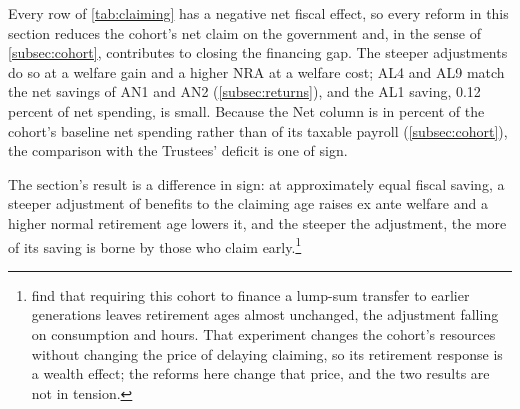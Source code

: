 Every row of \autoref{tab:claiming} has a negative net fiscal effect, so every reform in this section reduces the cohort's net claim on the government and, in the sense of \autoref{subsec:cohort}, contributes to closing the financing gap. %
The steeper adjustments do so at a welfare gain and a higher NRA at a welfare cost; AL4 and AL9 match the net savings of AN1 and AN2 (\autoref{subsec:returns}), and the AL1 saving, 0.12 percent of net spending, is small. %
Because the Net column is in percent of the cohort's baseline net spending rather than of its taxable payroll (\autoref{subsec:cohort}), the comparison with the Trustees' deficit is one of sign. %

The section's result is a difference in sign: at approximately equal fiscal saving, a steeper adjustment of benefits to the claiming age raises ex ante welfare and a higher normal retirement age lowers it, and the steeper the adjustment, the more of its saving is borne by those who claim early.\footnote{\citet{ndiaye2026flexible} find that requiring this cohort to finance a lump-sum transfer to earlier generations leaves retirement ages almost unchanged, the adjustment falling on consumption and hours. That experiment changes the cohort's resources without changing the price of delaying claiming, so its retirement response is a wealth effect; the reforms here change that price, and the two results are not in tension.} %
